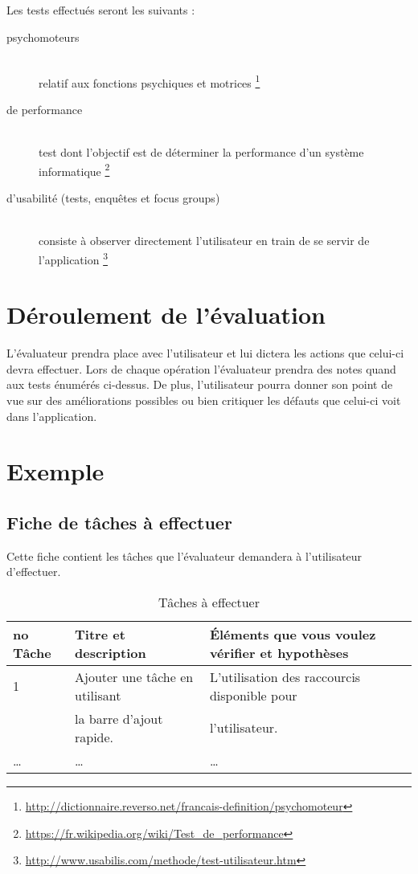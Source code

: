 \documentclass[letterpaper, oneside, 12pt,these,creativecommons]{thETS}
\begin{document}
Les tests effectués seront les suivants : 
\begin{description}
\item [psychomoteurs] \hfill \\ relatif aux fonctions psychiques et motrices \footnote{\url{http://dictionnaire.reverso.net/francais-definition/psychomoteur}}
\item [de performance] \hfill \\ test dont l'objectif est de déterminer la performance d'un système informatique \footnote{\url{https://fr.wikipedia.org/wiki/Test_de_performance}}
\item [d’usabilité (tests, enquêtes et focus groups)] \hfill \\ consiste à observer directement l'utilisateur en train de se servir de l'application \footnote{\url{http://www.usabilis.com/methode/test-utilisateur.htm}}
\end{description}

\section{Déroulement de l'évaluation}

L'évaluateur prendra place avec l'utilisateur et lui dictera les actions que celui-ci devra effectuer. Lors de chaque opération l'évaluateur prendra des notes quand aux tests énumérés ci-dessus. De plus, l'utilisateur pourra donner son point de vue sur des améliorations possibles ou bien critiquer les défauts que celui-ci voit dans l'application.

\section{Exemple}

\subsection{Fiche de tâches à effectuer}

Cette fiche contient les tâches que l'évaluateur demandera à l'utilisateur d'effectuer.

\begin{table}[H]
\centering
\begin{tabular}{|l|l|l|}
	\hline
	no Tâche & Titre et description & Éléments que vous voulez vérifier et hypothèses \\ \hline
	1 & Ajouter une tâche en utilisant & L'utilisation des raccourcis disponible pour \\ 
	   & la barre d'ajout rapide. &  l'utilisateur. \\ \hline
	\dots & \dots & \dots \\ \hline
\end{tabular}
\caption{Tâches à effectuer}
\end{table}
\end{document}

